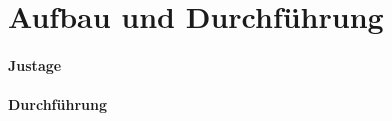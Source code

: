 \section{Aufbau und Durchführung}
\label{sec:Durchführung}

\paragraph{Justage}


\paragraph{Durchführung}
